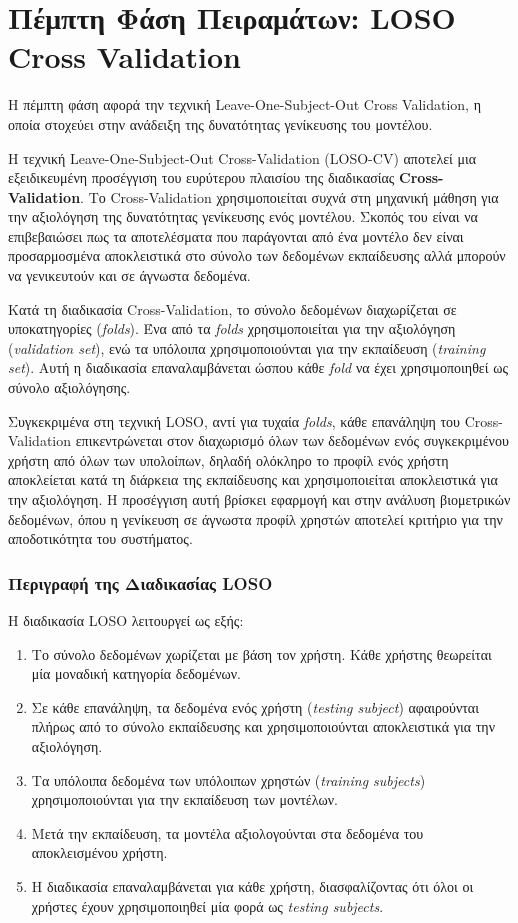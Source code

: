 \section{Πέμπτη Φάση Πειραμάτων: LOSO Cross Validation}
\label{sec:experiments_phase5}

Η πέμπτη φάση αφορά την τεχνική Leave-One-Subject-Out Cross Validation, η οποία στοχεύει στην ανάδειξη της δυνατότητας γενίκευσης του μοντέλου.

Η τεχνική Leave-One-Subject-Out Cross-Validation (LOSO-CV) αποτελεί μια εξειδικευμένη προσέγγιση του ευρύτερου πλαισίου της διαδικασίας \textbf{Cross-Validation}. Το Cross-Validation χρησιμοποιείται συχνά στη μηχανική μάθηση για την αξιολόγηση της δυνατότητας γενίκευσης ενός μοντέλου. Σκοπός του είναι να επιβεβαιώσει πως τα αποτελέσματα που παράγονται από ένα μοντέλο δεν είναι προσαρμοσμένα αποκλειστικά στο σύνολο των δεδομένων εκπαίδευσης αλλά μπορούν να γενικευτούν και σε άγνωστα δεδομένα.

Κατά τη διαδικασία Cross-Validation, το σύνολο δεδομένων διαχωρίζεται σε υποκατηγορίες (\emph{folds}). Ένα από τα \emph{folds} χρησιμοποιείται για την αξιολόγηση (\emph{validation set}), ενώ τα υπόλοιπα χρησιμοποιούνται για την εκπαίδευση (\emph{training set}). Αυτή η διαδικασία επαναλαμβάνεται ώσπου κάθε \emph{fold} να έχει χρησιμοποιηθεί ως σύνολο αξιολόγησης. 

Συγκεκριμένα στη τεχνική LOSO, αντί για τυχαία \emph{folds}, κάθε επανάληψη του Cross-Validation επικεντρώνεται στον διαχωρισμό όλων των δεδομένων ενός συγκεκριμένου χρήστη από όλων των υπολοίπων, δηλαδή ολόκληρο το προφίλ ενός χρήστη αποκλείεται κατά τη διάρκεια της εκπαίδευσης και χρησιμοποιείται αποκλειστικά για την αξιολόγηση. Η προσέγγιση αυτή βρίσκει εφαρμογή και στην ανάλυση βιομετρικών δεδομένων, όπου η γενίκευση σε άγνωστα προφίλ χρηστών αποτελεί κριτήριο για την αποδοτικότητα του συστήματος.

\subsubsection{Περιγραφή της Διαδικασίας LOSO}
Η διαδικασία LOSO λειτουργεί ως εξής:
\begin{enumerate}
    \item Το σύνολο δεδομένων χωρίζεται με βάση τον χρήστη. Κάθε χρήστης θεωρείται μία μοναδική κατηγορία δεδομένων.
    \item Σε κάθε επανάληψη, τα δεδομένα ενός χρήστη (\emph{testing subject}) αφαιρούνται πλήρως από το σύνολο εκπαίδευσης και χρησιμοποιούνται αποκλειστικά για την αξιολόγηση.
    \item Τα υπόλοιπα δεδομένα των υπόλοιπων χρηστών (\emph{training subjects}) χρησιμοποιούνται για την εκπαίδευση των μοντέλων.
    \item Μετά την εκπαίδευση, τα μοντέλα αξιολογούνται στα δεδομένα του αποκλεισμένου χρήστη.
    \item Η διαδικασία επαναλαμβάνεται για κάθε χρήστη, διασφαλίζοντας ότι όλοι οι χρήστες έχουν χρησιμοποιηθεί μία φορά ως \emph{testing subjects}.
\end{enumerate}

